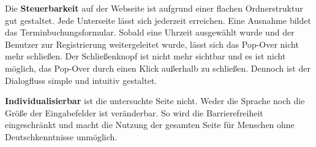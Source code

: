 Die \textbf{Steuerbarkeit} auf der Webseite ist aufgrund einer flachen Ordnerstruktur gut gestaltet. Jede Unterseite lässt sich jederzeit erreichen. Eine Ausnahme bildet das Terminbuchungsformular. Sobald eine Uhrzeit ausgewählt wurde und der Benutzer zur Registrierung weitergeleitet wurde, lässt sich das Pop-Over nicht mehr schließen. Der Schließenknopf ist nicht mehr sichtbar und es ist nicht möglich, das Pop-Over durch einen Klick außerhalb zu schließen. Dennoch ist der Dialogfluss simple und intuitiv gestaltet.

\textbf{Individualisierbar} ist die untersuchte Seite nicht. Weder die Sprache noch die Größe der Eingabefelder ist veränderbar. So wird die Barrierefreiheit eingeschränkt und macht die Nutzung der gesamten Seite für Menschen ohne Deutschkenntnisse unmöglich. 